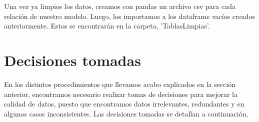\documentclass[10pt,a4paper]{article}
\begin{document}
Una vez ya limpios los datos, creamos con pandas un archivo csv para cada relación de nuestro modelo. Luego, los importamos 
a los dataframe vacíos creados anteriormente. Estos se encontrarán en la carpeta, 'TablasLimpias'.

\newpage

\section{Decisiones tomadas} 

En los distintos procedimientos que llevamos acabo explicados en la sección anterior, encontramos necesario realizar tomas de decisiones para mejorar la calidad de datos, puesto que encontramos datos irrelevantes, redundantes y en algunos casos inconsistentes. Las decisiones tomadas se detallan a continuación,
\end{document}
